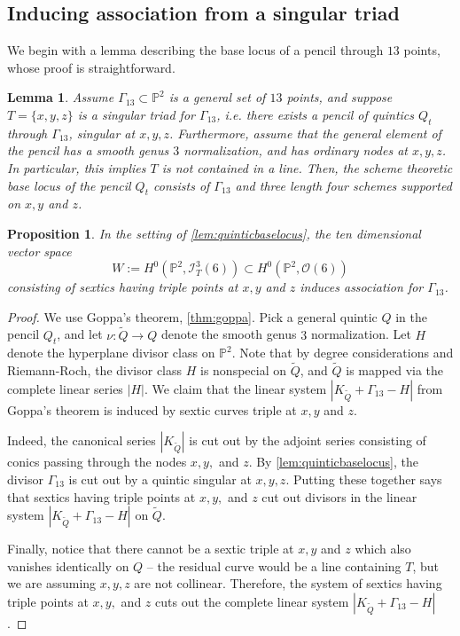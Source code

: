 \documentclass[reqno, 11pt]{amsart}
\theoremstyle{definition}
\theoremstyle{remark}
\numberwithin{equation}{section}
\numberwithin{thm}{section}
\numberwithin{prop}{section}
\numberwithin{lem}{section}
\numberwithin{cor}{section}
\numberwithin{conj}{section}
\numberwithin{defn}{section}
\newcommand{\td}{\widetilde}
\renewcommand{\to}{\longrightarrow}
\newcommand {\from}{{\colon}}
\theoremstyle{plain}
\newtheorem{proposition}[theorem]{Proposition}
\newtheorem{lemma}[theorem]{Lemma}
\theoremstyle{definition}
\newcommand\bp{{\mathbb P}}
\newcommand\so{{\mathscr O}}
\newcommand\sci{\mathscr I}
\begin{document}
\subsection{Inducing association from a singular triad} 

We begin with a lemma describing the base locus of a pencil through $13$
points, whose proof is straightforward.
\begin{lemma}\label{lem:quinticbaselocus}
	Assume $\Gamma_{13} \subset \bp^2$ is a general set of $13$ points, and suppose $T = \{x,y,z\}$ is a singular triad for $\Gamma_{13}$, i.e. there exists a pencil of quintics $Q_{t}$ through $\Gamma_{13}$, singular at $x,y,z$. Furthermore, assume that the general element of the pencil has a smooth genus $3$ normalization, and has ordinary nodes at $x,y,z$. In particular, this implies $T$ is not contained in a line.  
Then, the scheme theoretic base locus of the pencil $Q_{t}$ consists of $\Gamma_{13}$ and three length four schemes supported on $x,y$ and $z$.
\end{lemma}

\begin{proposition}\label{prop:6h-3x-3y-3z}
	In the setting of \autoref{lem:quinticbaselocus}, the ten dimensional vector space \[W := H^{0}(\bp^{2}, \sci_{T}^{3}(6)) \subset H^{0}(\bp^{2}, \so(6))\] consisting of sextics having triple points at $x,y$ and $z$ induces association for $\Gamma_{13}$.
\end{proposition}

\begin{proof}
	We use Goppa's theorem, \autoref{thm:goppa}. Pick a general quintic $Q$ in the pencil $Q_{t}$, and let $\nu \from \td{Q} \to Q$ denote the smooth genus $3$ normalization.
	Let $H$ denote the hyperplane divisor class on $\bp^{2}$. 
	Note that by degree considerations and Riemann-Roch, the divisor class $H$ is nonspecial on $\td{Q}$, and $\td{Q}$ is mapped 
		via the complete linear series $|H|$. We claim that the linear system $|K_{\td{Q}} + \Gamma_{13} - H|$ from Goppa's theorem is induced by sextic curves triple at $x,y$ and $z$.

Indeed, the canonical series $|K_{\td{Q}}|$ is cut out by the adjoint series consisting of conics passing through the nodes $x,y,$ and $z$.  By \autoref{lem:quinticbaselocus}, the divisor $\Gamma_{13}$ is cut out by a quintic singular at $x,y,z$.  Putting these together says that sextics having triple points at $x,y,$ and $z$ cut out divisors in the linear system $|K_{\td{Q}} + \Gamma_{13} - H|$ on $\td{Q}$. 

Finally, notice that there cannot be a sextic triple at $x,y$ and $z$ which also vanishes identically on $Q$ -- the residual curve would be a line containing $T$, but we are assuming $x,y,z$ are not collinear. Therefore, the system of sextics having triple points at $x,y,$ and $z$ cuts out the complete linear system $|K_{\td{Q}} + \Gamma_{13} - H|$. 
\end{proof}
\end{document}
